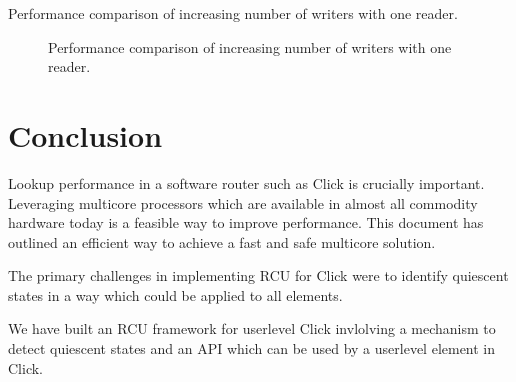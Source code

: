 \documentclass[12pt,a4paper]{article}
\begin{document}
\begin{table}[tph]
\begin{center}

\end{center}
\label{tbl:micro_1r_vw}
\caption{Performance comparison of increasing number of writers with one reader.}
\end{table}

\begin{figure}[tph]
\begin{center}
\caption{Performance comparison of increasing number of writers with one reader.}
\label{img:micro_1r_vw}
\end{center}
\end{figure}


\section{Conclusion}
Lookup performance in a software router such as Click is crucially
important. Leveraging multicore processors which are available in almost all commodity hardware
today is a feasible way to improve performance. This document has outlined an efficient way to achieve a fast and safe multicore solution.


The primary challenges in implementing RCU for Click were to
identify quiescent states in a way which could be applied to all
elements. 

We have built an RCU framework for userlevel Click invlolving a
mechanism to detect quiescent states and an API which can be used by
a userlevel element in Click.
\end{document}
